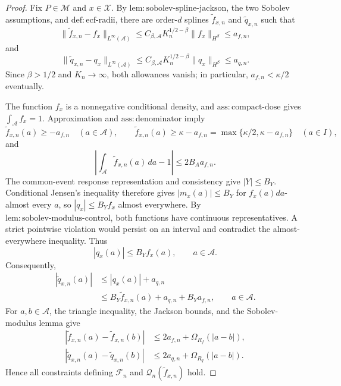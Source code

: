 \documentclass{article}
\begin{document}
\begin{proof}
Fix \(P\in\mathcal M\) and \(x\in\mathcal X\). By \(\mathrm{lem{:}sobolev\text{-}spline\text{-}jackson}\), the two Sobolev assumptions, and \(\mathrm{def{:}ecf\text{-}radii}\), there are order-\(d\) splines \(\widetilde f_{x,n}\) and \(\widetilde q_{x,n}\) such that
\[
 \|\widetilde f_{x,n}-f_x\|_{L^\infty(\mathcal A)}
 \le C_{\beta,\mathcal A}K_n^{1/2-\beta}\|f_x\|_{H^\beta}
 \le a_{f,n},
\]
and
\[
 \|\widetilde q_{x,n}-q_x\|_{L^\infty(\mathcal A)}
 \le C_{\beta,\mathcal A}K_n^{1/2-\beta}\|q_x\|_{H^\beta}
 \le a_{q,n}.
\]
Since \(\beta>1/2\) and \(K_n\to\infty\), both allowances vanish; in particular, \(a_{f,n}<\kappa/2\) eventually.

The function \(f_x\) is a nonnegative conditional density, and \(\mathrm{ass{:}compact\text{-}dose}\) gives \(\int_{\mathcal A}f_x=1\). Approximation and \(\mathrm{ass{:}denominator}\) imply
\[
 \widetilde f_{x,n}(a)\ge-a_{f,n}\quad(a\in\mathcal A),
 \qquad
 \widetilde f_{x,n}(a)\ge\kappa-a_{f,n}
 =\max\{\kappa/2,\kappa-a_{f,n}\}\quad(a\in I),
\]
and
\[
 \left|\int_{\mathcal A}\widetilde f_{x,n}(a)\,da-1\right|
 \le2B_Aa_{f,n}.
\]
The common-event response representation and consistency give \(|Y|\le B_Y\). Conditional Jensen's inequality therefore gives \(|m_x(a)|\le B_Y\) for \(f_x(a)da\)-almost every \(a\), so \(|q_x|\le B_Yf_x\) almost everywhere. By \(\mathrm{lem{:}sobolev\text{-}modulus\text{-}control}\), both functions have continuous representatives. A strict pointwise violation would persist on an interval and contradict the almost-everywhere inequality. Thus
\[
 |q_x(a)|\le B_Yf_x(a),\qquad a\in\mathcal A.
\]
Consequently,
\[
 \begin{aligned}
 |\widetilde q_{x,n}(a)|
 &\le |q_x(a)|+a_{q,n}\\
 &\le B_Y\widetilde f_{x,n}(a)+a_{q,n}+B_Ya_{f,n},
 \qquad a\in\mathcal A.
 \end{aligned}
\]
For \(a,b\in\mathcal A\), the triangle inequality, the Jackson bounds, and the Sobolev-modulus lemma give
\[
 \begin{aligned}
 |\widetilde f_{x,n}(a)-\widetilde f_{x,n}(b)|
 &\le 2a_{f,n}+\Omega_{R_f}(|a-b|),\\
 |\widetilde q_{x,n}(a)-\widetilde q_{x,n}(b)|
 &\le 2a_{q,n}+\Omega_{R_q}(|a-b|).
 \end{aligned}
\]
Hence all constraints defining \(\mathscr F_n\) and \(\mathscr Q_n(\widetilde f_{x,n})\) hold.


\end{proof}
\end{document}
